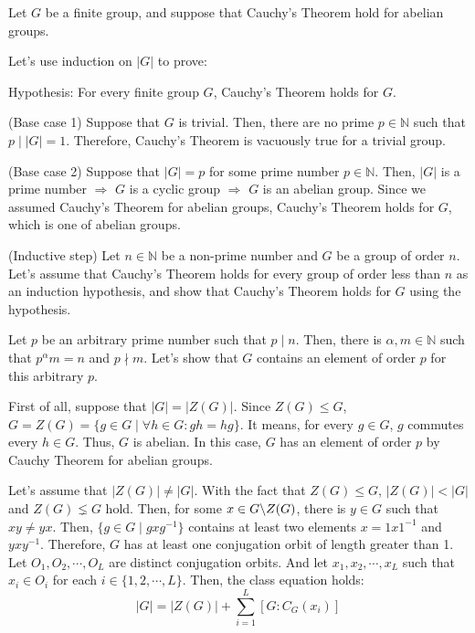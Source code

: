 \documentclass{article}
\newcommand{\bs}{\char`\\}
\newcommand{\bbN}{\mathbb{N}}
\begin{document}
\noindent
Let \(G\) be a finite group,
and suppose that Cauchy's Theorem hold for abelian groups.

Let's use induction on \(|G|\) to prove:

Hypothesis: For every finite group \(G\), Cauchy's Theorem holds for \(G\).
\newline

\noindent
(Base case 1) Suppose that \(G\) is trivial. Then, there are no prime \(p \in \bbN\) such that \(p \mid |G| = 1\). Therefore, Cauchy's Theorem is vacuously true for a trivial group.
\newline

\noindent
(Base case 2) Suppose that \(|G| = p\) for some prime number \(p \in \bbN\).
Then, \(|G|\) is a prime number \(\Rightarrow\) \(G\) is a cyclic group \(\Rightarrow\) \(G\) is an abelian group.
Since we assumed Cauchy's Theorem for abelian groups, Cauchy's Theorem holds for \(G\), which is one of abelian groups.
\newline

\noindent
(Inductive step)
Let \(n \in \bbN\) be a non-prime number and \(G\) be a group of order \(n\).
Let's assume that Cauchy's Theorem holds for every group of order less than \(n\) as an induction hypothesis,
and show that Cauchy's Theorem holds for \(G\) using the hypothesis.

Let \(p\) be an arbitrary prime number such that \(p \mid n\).
Then, there is \(\alpha, m \in \bbN\) such that \(p^{\alpha}m = n\) and \(p \nmid m\).
Let's show that \(G\) contains an element of order \(p\) for this arbitrary \(p\).
\newline

First of all, suppose that \(|G| = |Z(G)|\).
Since \(Z(G) \le G\), \(G = Z(G) = \{g \in G \mid \forall h \in G: gh = hg\}\).
It means, for every \(g \in G\), \(g\) commutes every \(h \in G\).
Thus, \(G\) is abelian.
In this case, \(G\) has an element of order \(p\) by Cauchy Theorem for abelian groups.
\newline

Let's assume that \(|Z(G)| \neq |G|\). With the fact that \(Z(G) \le G\), \(|Z(G)| < |G|\) and \(Z(G) \lneq G\) hold.
Then, for some \(x \in G \bs Z(G)\), there is \(y \in G\) such that \(xy \neq yx\).
Then, \(\{g \in G \mid gxg^{-1}\}\) contains at least two elements \(x = 1x1^{-1}\) and \(yxy^{-1}\).
Therefore, \(G\) has at least one conjugation orbit of length greater than 1.
Let \(O_1, O_2, \cdots, O_L\) are distinct conjugation orbits.
And let \(x_1, x_2, \cdots, x_L\) such that \(x_i \in O_i\) for each \(i \in \{1, 2, \cdots, L\}\).
Then, the class equation holds:
\[|G| = |Z(G)| + \sum_{i=1}^{L} [G : C_G(x_i)]\]
\end{document}
